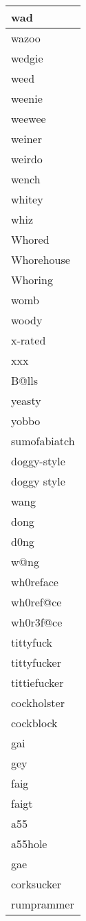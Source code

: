\begin{longtable}{|l|}
wad \\ \hline 
wazoo \\ \hline 
wedgie \\ \hline 
weed \\ \hline 
weenie \\ \hline 
weewee \\ \hline 
weiner \\ \hline 
weirdo \\ \hline 
wench \\ \hline 
whitey \\ \hline 
whiz \\ \hline 
Whored \\ \hline 
Whorehouse \\ \hline 
Whoring \\ \hline 
womb \\ \hline 
woody \\ \hline 
x-rated \\ \hline 
xxx \\ \hline 
B@lls \\ \hline 
yeasty \\ \hline 
yobbo \\ \hline 
sumofabiatch \\ \hline 
doggy-style \\ \hline 
doggy style \\ \hline 
wang \\ \hline 
dong \\ \hline 
d0ng \\ \hline 
w@ng \\ \hline 
wh0reface \\ \hline 
wh0ref@ce \\ \hline 
wh0r3f@ce \\ \hline 
tittyfuck \\ \hline 
tittyfucker \\ \hline 
tittiefucker \\ \hline 
cockholster \\ \hline 
cockblock \\ \hline 
gai \\ \hline 
gey \\ \hline 
faig \\ \hline 
faigt \\ \hline 
a55 \\ \hline 
a55hole \\ \hline 
gae \\ \hline 
corksucker \\ \hline 
rumprammer \\ \hline 

\end{longtable}
